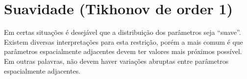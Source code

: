 \section{Suavidade (Tikhonov de order 1)}

Em certas situações é desejável que a distribuição dos parâmetros seja ``suave''.
Existem diversas interpretações para esta restrição, porém a mais comum é que
parâmetros espacialmente adjacentes devem ter valores mais próximos possível.
Em outras palavras, não devem haver variações abruptas entre parâmetros
espacialmente adjacentes. 
